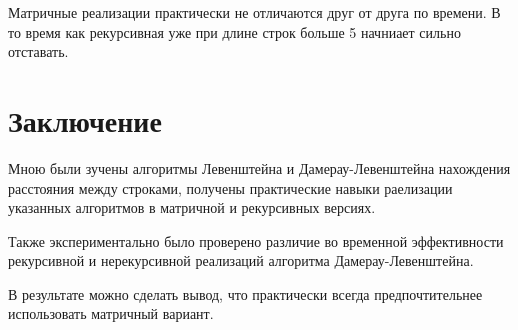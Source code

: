 \documentclass[12pt]{report}
\begin{document}


\par
Матричные реализации практически не отличаются друг от друга по времени. В то время как рекурсивная уже при длине строк больше 5 начниает сильно отставать.

\chapter*{Заключение}
Мною были зучены алгоритмы Левенштейна и Дамерау-Левенштейна нахождения расстояния между строками, получены практические навыки раелизации указанных алгоритмов
в матричной  и рекурсивных версиях. 

Также экспериментально было проверено различие во временной эффективности рекурсивной и нерекурсивной реализаций алгоритма Дамерау-Левенштейна.

В результате можно сделать вывод, что практически всегда предпочтительнее использовать матричный вариант.
\end{document}

